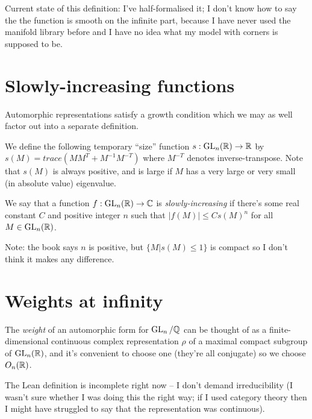 Current state of this definition: I've half-formalised it; I don't know how to say the the
function is smooth on the infinite part, because I have never used the manifold library before
and I have no idea what my model with corners is supposed to be.

\section{Slowly-increasing functions}

Automorphic representations satisfy a growth condition which we may as well factor out
into a separate definition.

We define the following temporary ``size'' function $s:\operatorname{GL}_n(\mathbb{R})\to\mathbb{R}$ by
$s(M)=trace(MM^T+M^{-1}M^{-T})$ where $M^{-T}$ denotes inverse-transpose. Note that
$s(M)$ is always positive, and is large if $M$ has a very large or very small
(in absolute value) eigenvalue.

\begin{definition}
  \label{AutomorphicForm.GLn.IsSlowlyIncreasing}
  \leanok
  We say that a function $f:\operatorname{GL}_n(\mathbb{R})\to\mathbb{C}$ is \emph{slowly-increasing}
  if there's some real constant $C$ and positive integer $n$ such that $|f(M)|\leq Cs(M)^n$
  for all $M\in\operatorname{GL}_n(\mathbb{R})$.
\end{definition}

Note: the book says $n$ is positive, but $\{M|s(M)\leq 1\}$ is compact so I don't
think it makes any difference.

\section{Weights at infinity}

\begin{definition}
  \label{AutomorphicForm.GLn.Weight}

The \emph{weight} of an automorphic form for $\operatorname{GL}_n/\mathbb{Q}$ can be thought of as a finite-dimensional
continuous complex representation $\rho$ of a maximal compact subgroup of $\operatorname{GL}_n(\mathbb{R})$,
and it's convenient to choose one (they're all conjugate) so we choose $O_n(\mathbb{R})$.
\end{definition}

The Lean definition is incomplete right now -- I don't demand irreducibility
(I wasn't sure whether I was doing this the right way; if I used category theory
then I might have struggled to say that the representation was continuous).


